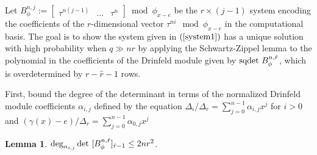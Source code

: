 \documentclass[sigconf]{acmart}
\newtheorem{lemma}{Lemma}
\newcommand{\hatr}{\hat{r}}
\newcommand{\sqdet}{\textnormal{sqdet }}
\begin{document}
Let $B_{\phi}^{n,j} := \begin{bmatrix} \tau^{n(j-1)} & \ldots & \tau^{n} \end{bmatrix} \bmod \phi_{x-e}$ be the $r \times (j -1)$ system encoding the coefficients of the $r$-dimensional vector $\tau^{ni} \mod \phi_{x -e}$ in the computational basis. The goal is to show the system given in $(\ref{system1})$ has a unique solution with high probability when $q \gg nr$ by applying the Schwartz-Zippel lemma to the polynomial in the coefficients of the Drinfeld module given by $\sqdet B_{\phi}^{n,\hatr}$, which is overdetermined by $ r - \hat{r} - 1$ rows.


First, bound the degree of the determinant in terms of the normalized Drinfeld module coefficients $\alpha_{i,j}$ defined by the equation $ \Delta_i/\Delta_r = \sum_{j=0}^{n-1}\alpha_{i,j}x^j$ for $i > 0$ and $ (\gamma(x) - e)/\Delta_r = \sum_{j=0}^{n-1}\alpha_{0,j}x^j$

\begin{lemma}
$\deg_{\alpha_{i,j}} \textnormal{det }  [B_{\phi}^{n,\hatr}]_{\hatr-1}\leq 2nr^2$.
\end{lemma}
\end{document}
